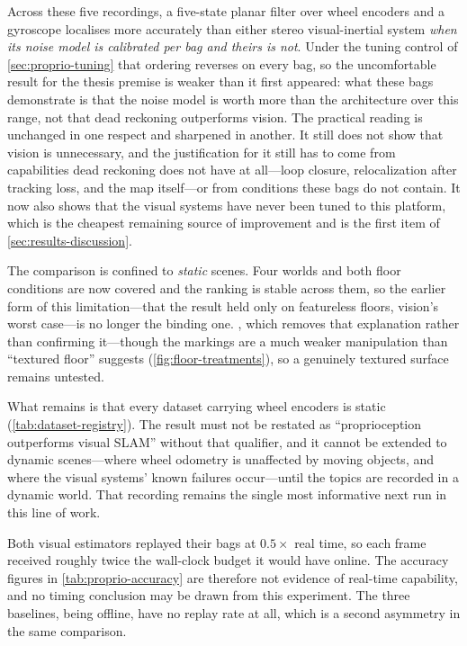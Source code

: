 Across these five recordings, a five-state planar filter over wheel encoders and a
gyroscope localises more accurately than either stereo visual-inertial system
\emph{when its noise model is calibrated per bag and theirs is not}. Under the
tuning control of \cref{sec:proprio-tuning} that ordering reverses on every bag,
so the uncomfortable result for the thesis premise is weaker than it first
appeared: what these bags demonstrate is that the noise model is worth more than
the architecture over this range, not that dead reckoning outperforms vision. The
practical reading is unchanged in one respect and sharpened in another. It still
does not show that vision is unnecessary, and the justification for it still has
to come from capabilities dead reckoning does not have at all---loop closure,
relocalization after tracking loss, and the map itself---or from conditions these
bags do not contain. It now also shows that the visual systems have never been
tuned to this platform, which is the cheapest remaining source of improvement and
is the first item of \cref{sec:results-discussion}.

\begin{queried}
The comparison is confined to \emph{static} scenes. Four worlds and both floor
conditions are now covered and the ranking is stable across them, so the earlier
form of this limitation---that the result held only on featureless floors, vision's
worst case---is no longer the binding one. , which removes that explanation rather than confirming
it---though the markings are a much weaker manipulation than ``textured floor''
suggests (\cref{fig:floor-treatments}), so a genuinely textured surface remains
untested.

What remains is that every dataset carrying wheel encoders is static
(\cref{tab:dataset-registry}). The result must not be restated as
``proprioception outperforms visual SLAM'' without that qualifier, and it cannot
be extended to dynamic scenes---where wheel odometry is unaffected by moving
objects, and where the visual systems' known failures occur---until the
 topics are recorded in a dynamic world. That recording remains
the single most informative next run in this line of work.
\end{queried}

\begin{queried}[Queried]
Both visual estimators replayed their bags at $0.5\times$ real time, so each frame
received roughly twice the wall-clock budget it would have online. The accuracy
figures in \cref{tab:proprio-accuracy} are therefore not evidence of real-time
capability, and no timing conclusion may be drawn from this experiment. The three
baselines, being offline, have no replay rate at all, which is a second asymmetry
in the same comparison.
\end{queried}

